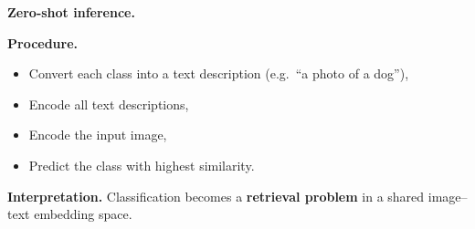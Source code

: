 \textbf{Zero-shot inference.}

\textbf{Procedure.}
\begin{itemize}
    \item Convert each class into a text description
          (e.g.\ ``a photo of a dog''),
    \item Encode all text descriptions,
    \item Encode the input image,
    \item Predict the class with highest similarity.
\end{itemize}

\textbf{Interpretation.}
Classification becomes a \textbf{retrieval problem}
in a shared image--text embedding space.
